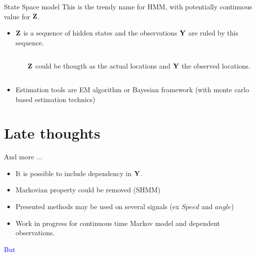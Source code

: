 \documentclass{beamer}\usepackage[]{graphicx}\usepackage[]{color}
\newcommand{\blue}[1]{\textcolor{blue}{#1}}
\newcommand{\Ybf}{{\bf Y}}
\newcommand{\Zbf}{{\bf Z}}
\begin{document}
\begin{frame}{State Space model}
This is the trendy name for HMM, with potentially continuous value for $\Zbf$.

\pause
\begin{itemize}
\item $\Zbf$ is a sequence of hidden states and the observations $\Ybf$ are ruled by this sequence.
\begin{columns}
 \begin{column}{0.3\textwidth}
{}
\end{column}
\begin{column}{0.7\textwidth}
$\Zbf$ could be thougth as the actual locations and $\Ybf$ the observed locations.
\end{column}
\end{columns}

\pause
\item 
Estimation tools are EM algorithm or Bayesian framework (with monte carlo based estimation technics)
\end{itemize}
\end{frame}

\section{Late thoughts}
\begin{frame}{And more ...}
\begin{itemize}
\item It is possible to include dependency in $\Ybf$.
\item Markovian property could be removed (SHMM)
\item Presented methods may be used on several signals (ex $Speed$ and $angle$)
\item Work in progress for continuous time Markov model and dependent observations.
\end{itemize}
\blue{But}

\end{frame}
\end{document}

